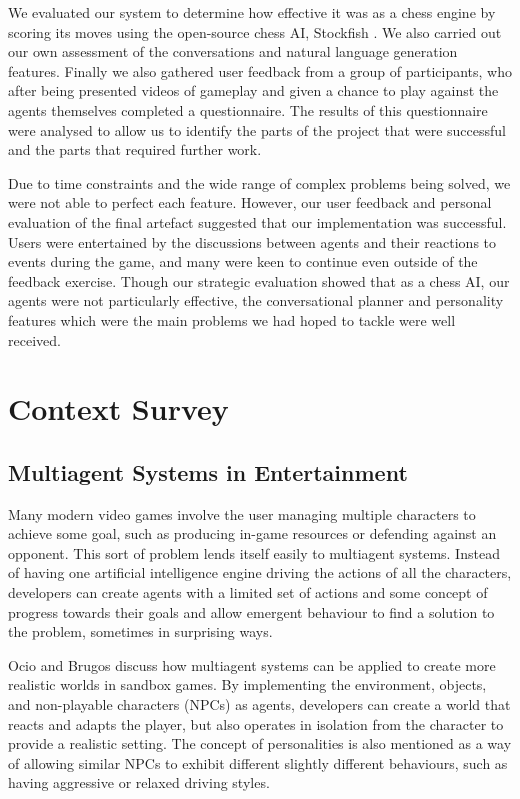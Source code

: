 \documentclass{article}
\begin{document}
We evaluated our system to determine how effective it was as a chess engine by scoring its moves using the open-source chess AI, Stockfish \cite{stockfish}. We also carried out our own assessment of the conversations and natural language generation features. Finally we also gathered user feedback from a group of participants, who after being presented videos of gameplay and given a chance to play against the agents themselves completed a questionnaire. The results of this questionnaire were analysed to allow us to identify the parts of the project that were successful and the parts that required further work.

Due to time constraints and the wide range of complex problems being solved, we were not able to perfect each feature. However, our user feedback and personal evaluation of the final artefact suggested that our implementation was successful. Users were entertained by the discussions between agents and their reactions to events during the game, and many were keen to continue even outside of the feedback exercise. Though our strategic evaluation showed that as a chess AI, our agents were not particularly effective, the conversational planner and personality features which were the main problems we had hoped to tackle were well received.

\section{Context Survey}

\subsection{Multiagent Systems in Entertainment}

Many modern video games involve the user managing multiple characters to achieve some goal, such as producing in-game resources or defending against an opponent. This sort of problem lends itself easily to multiagent systems. Instead of having one artificial intelligence engine driving the actions of all the characters, developers can create agents with a limited set of actions and some concept of progress towards their goals and allow emergent behaviour to find a solution to the problem, sometimes in surprising ways. 

Ocio and Brugos \cite{sandboxmas} discuss how multiagent systems can be applied to create more realistic worlds in sandbox games. By implementing the environment, objects, and non-playable characters (NPCs) as agents, developers can create a world that reacts and adapts the player, but also operates in isolation from the character to provide a realistic setting. The concept of personalities is also mentioned as a way of allowing similar NPCs to exhibit different slightly different behaviours, such as having aggressive or relaxed driving styles.
\end{document}
